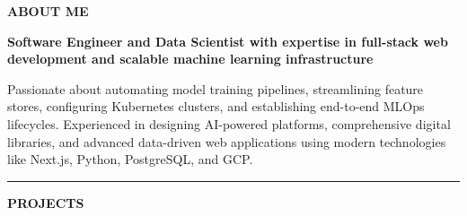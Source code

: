 \documentclass[a4paper,10pt]{article}
\begin{document}
\begin{minipage}[t]{12.2cm}
    \vspace{0pt}
    \begin{center}
        \Large\textbf{ABOUT ME}
    \end{center}
    \vspace{0.1cm}
    
    \begin{center}
        \textbf{Software Engineer and Data Scientist with expertise in full-stack web development and scalable machine learning infrastructure}
    \end{center}
    \vspace{0.1cm}
    
    \textcolor{LightText}{\small Passionate about automating model training pipelines, streamlining feature stores, configuring Kubernetes clusters, and establishing end-to-end MLOps lifecycles. Experienced in designing AI-powered platforms, comprehensive digital libraries, and advanced data-driven web applications using modern technologies like Next.js, Python, PostgreSQL, and GCP.}
    
    \vspace{0.3cm}
    \hrule
    \vspace{0.3cm}
    
    \Large\textbf{PROJECTS}
    \vspace{0.2cm}
    \normalsize
    

\end{minipage}
\end{document}

